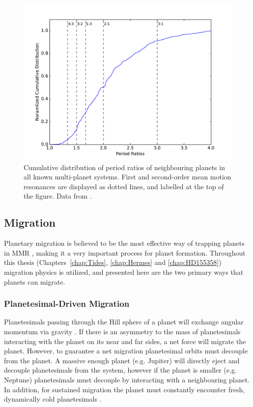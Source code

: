\begin{figure}
\centering
\includegraphics[width=1.00\textwidth]{intro/PeriodRatios}
\caption{
Cumulative distribution of period ratios of neighbouring planets in all known multi-planet systems.
 First and second-order mean motion resonances are displayed as dotted lines, and labelled at the top of the figure. 
 Data from \citet{Akeson2013}.}
\label{fig:KepMMR}
\end{figure}

\subsection{Migration}
\label{sec:migration}
Planetary migration is believed to be the most effective way of trapping planets in MMR \citep[e.g.][]{Lee2002}, making it a very important process for planet formation.  
Throughout this thesis (Chapters~\ref{chap:Tides}, \ref{chap:Hermes} and \ref{chap:HD155358}) migration physics is utilized, and presented here are the two primary ways that planets can migrate.

\subsubsection{Planetesimal-Driven Migration}
Planetesimals passing through the Hill sphere of a planet will exchange angular momentum via gravity \citep{Ida2000, Kirsh2009}.
If there is an asymmetry to the mass of planetesimals interacting with the planet on its near and far sides, a net force will migrate the planet. 
However, to guarantee a net migration planetesimal orbits must decouple from the planet. 
A massive enough planet (e.g. Jupiter) will directly eject and decouple planetesimals from the system, however if the planet is smaller (e.g. Neptune) planetesimals must decouple by interacting with a neighbouring planet. 
In addition, for sustained migration the planet must constantly encounter fresh, dynamically cold planetesimals \citep{Gomes2004}.  

